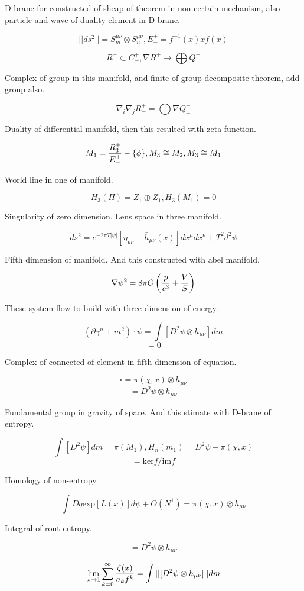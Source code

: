 \documentclass{jsarticle}
\begin{document}
  D-brane  for constructed of sheap of theorem in non-certain mechanism, also particle and wave of duality 
element in D-brane.
  
$$ ||ds^2|| = S^{\mu\nu}_m \otimes S^{\mu\nu}_n, E^{+}_{-} = f^{-1}(x)xf(x) $$

$$ R^{+} \subset C^{+}_{-}, \nabla R^{+} \to \bigoplus Q^{+}_{-} $$

Complex of group in this manifold, and finite of group decomposite theorem, add group also.


$$ \nabla_{i}\nabla_{j}R^{+}_{-} = \bigoplus \nabla Q^{+}_{-} $$

Duality of differential manifold, then this resulted with zeta function.

$$ M_1 = {R^{+}_3 \over E^{+}_{-}} - \{\phi\}, M_3 \cong M_2, M_3 \cong M_1 $$

World line in one of manifold.

$$ H_3(\Pi) = Z_1 \oplus Z_1, H_3(M_1) = 0 $$

Singularity of zero dimension. Lens space in three manifold.

$$ ds^2 = e^{-2\pi T|\psi|}[\eta_{\mu\nu} + \bar{h}_{\mu\nu}(x)]dx^{\mu}dx^{\nu} + T^2 d^2 \psi $$

Fifth dimension of manifold. And this constructed with abel manifold.

$$ \nabla \psi^2 = 8 \pi G\left({p \over c^3} + {V \over S}\right) $$

These system flow to build with three dimension of energy.

$$ (\partial \gamma^n + m^2)\cdot \psi = \int[D^2 \psi \otimes h_{\mu\nu}]dm $$
$$ = 0 $$

Complex of connected of element in fifth dimension of equation.

$$ \square = \pi(\chi,x) \otimes h_{\mu\nu} $$
$$ = D^2 \psi \otimes h_{\mu\nu} $$
 
Fundamental group in gravity of space. And this stimate with D-brane of entropy.

$$ \int[D^2 \psi]dm = \pi(M_1),H_n(m_1) = D^2 \psi - \pi(\chi,x) $$
$$ = \mathrm{ker}f/\mathrm{im}f $$

Homology of non-entropy.

$$ \int Dq\mathrm{exp}[L(x)]d\psi + O(N^{1}) = \pi(\chi,x) \otimes h_{\mu\nu} $$

Integral of rout entropy.

$$ = D^2 \psi \otimes h_{\mu\nu} $$

$$ \lim_{x \to 1} \sum_{k= 0}^{\infty}{\zeta(x) \over a_kf^k} = \int ||[D^2 \psi \otimes h_{\mu\nu}]||dm $$
\end{document}

